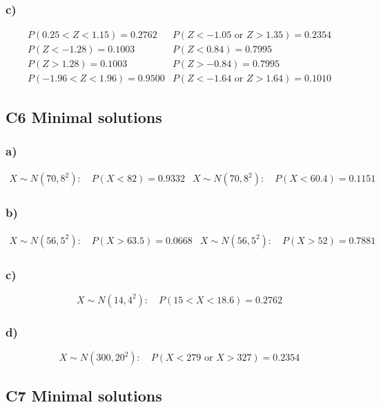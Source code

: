 	\subsubsection*{c)}
	\[
	\begin{array}{ll}
		P(0.25<Z<1.15)=0.2762
		&
		P(Z<-1.05\text{ or }Z>1.35)=0.2354
		\\[0.2cm]
		P(Z<-1.28)=0.1003
		&
		P(Z<0.84)=0.7995
		\\[0.2cm]
		P(Z>1.28)=0.1003
		&
		P(Z>-0.84)=0.7995
		\\[0.2cm]
		P(-1.96<Z<1.96)=0.9500
		&
		P(Z<-1.64\text{ or }Z>1.64)=0.1010
	\end{array}
	\]
	
	\subsection{C6 Minimal solutions}
	
	\subsubsection*{a)}
	\[
	\begin{array}{ll}
		X\sim N(70,8^2):\quad P(X<82)=0.9332
		&
		X\sim N(70,8^2):\quad P(X<60.4)=0.1151
	\end{array}
	\]
	
	\subsubsection*{b)}
	\[
	\begin{array}{ll}
		X\sim N(56,5^2):\quad P(X>63.5)=0.0668
		&
		X\sim N(56,5^2):\quad P(X>52)=0.7881
	\end{array}
	\]
	
	\subsubsection*{c)}
	\[
	X\sim N(14,4^2):\quad P(15<X<18.6)=0.2762
	\]
	
	\subsubsection*{d)}
	\[
	X\sim N(300,20^2):\quad P(X<279\text{ or }X>327)=0.2354
	\]
	
	\subsection{C7 Minimal solutions}
	
